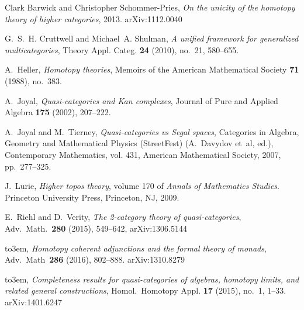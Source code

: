 \documentclass[12pt,reqno]{amsart}
\theoremstyle{plain}
\theoremstyle{definition}
\theoremstyle{remark}
\numberwithin{equation}{subsection}
\begin{document}
\providecommand{\bysame}{\leavevmode\hbox to3em{\hrulefill}\thinspace}
\providecommand{\MR}{\relax\ifhmode\unskip\space\fi MR }
\providecommand{\MRhref}[2]{%
  \href{http://www.ams.org/mathscinet-getitem?mr=#1}{#2}
}
\providecommand{\href}[2]{#2}
\begin{thebibliography}{RV-III}

Clark Barwick and Christopher Schommer-Pries, \emph{On the unicity of the
  homotopy theory of higher categories}, 2013. \href{https://arxiv.org/abs/1112.0040}{arXiv:1112.0040}

G.~S.~H. Cruttwell and Michael~A. Shulman, \emph{A unified framework for
  generalized multicategories}, Theory Appl. Categ. \textbf{24} (2010), no.~21,
  580--655.

A.~Heller, \emph{Homotopy theories}, Memoirs of the American Mathematical
  Society \textbf{71} (1988), no.~383.

A.~Joyal, \emph{Quasi-categories and {K}an complexes}, Journal of Pure and
  Applied Algebra \textbf{175} (2002), 207--222.

A.~Joyal and M.~Tierney, \emph{Quasi-categories vs {S}egal spaces}, Categories
  in Algebra, Geometry and Mathematical Physics (StreetFest) (A.~Davydov et~al,
  ed.), Contemporary Mathematics, vol. 431, American Mathematical Society,
  2007, pp.~277--325.
  
  J.~Lurie, {\em Higher topos theory}, volume 170 of {\em Annals of Mathematics
  Studies}. Princeton University Press, Princeton, NJ, 2009.
  
  


E.~Riehl and D.~Verity,  \emph{The 2-category theory of quasi-categories}, Adv.~Math.~{\bf 280} (2015), 549--642, \href{http://arxiv.org/abs/1306.5144}{arXiv:1306.5144}
  
\bysame, \emph{Homotopy coherent adjunctions and the formal
  theory of monads},  Adv.~Math~{\bf 286} (2016), 802--888.   \href{http://arxiv.org/abs/1310.8279}{arXiv:1310.8279}


\bysame, \emph{Completeness results for quasi-categories of algebras, homotopy
  limits, and related general constructions}, Homol.~Homotopy Appl. \textbf{17}
  (2015), no.~1, 1--33. \href{http://arxiv.org/abs/1401.6247}{arXiv:1401.6247}



\end{thebibliography}
\end{document}
